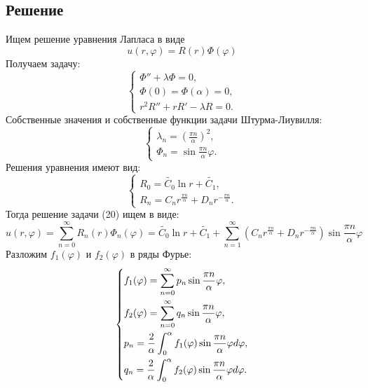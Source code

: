 \documentclass[11pt]{article}
\begin{document}
\subsection{Решение}
\label{sec:orgbcb9ae5}
Ищем решение уравнения Лапласа в виде
\begin{equation*}
u(r, \varphi) = R(r)\Phi(\varphi)
\end{equation*}
Получаем задачу:
\begin{equation*}
\begin{cases}
\Phi'' + \lambda\Phi = 0, \\
\Phi(0) = \Phi(\alpha) = 0, \\
r^2R'' + rR' - \lambda R = 0.
\end{cases}
\end{equation*}
Собственные значения и собственные функции задачи Штурма-Лиувилля:
\begin{equation*}
\begin{cases}
\lambda_n = \left(\frac{\pi n}{\alpha}\right)^2, \\
\Phi_n = \sin\frac{\pi n}{\alpha}\varphi.
\end{cases}
\end{equation*}
Решения уравнения имеют вид:
\begin{equation*}
\begin{cases}
R_0 = \tilde{C_0}\ln r + \tilde{C_1}, \\
R_n = C_nr^{\frac{\pi n}\alpha} + D_nr^{-\frac{\pi n}\alpha}.
\end{cases}
\end{equation*}
Тогда решение задачи (20) ищем в виде:
\begin{equation}
u(r, \varphi) = \sum_{n = 0}^{\infty}R_n(r)\Phi_n(\varphi) = \tilde{C_0}\ln r + \tilde{C_1} +
\sum_{n = 1}^{\infty}(C_nr^{\frac{\pi n}\alpha} + D_nr^{-\frac{\pi n}\alpha})\sin\frac{\pi n}\alpha\varphi
\end{equation}
Разложим $f_1(\varphi)$ и $f_2(\varphi)$ в ряды Фурье:
\begin{equation*}
\begin{dcases}
f_1(\varphi) = \sum_{n = 0}^{\infty}p_n\sin\frac{\pi n}\alpha\varphi, \\
f_2(\varphi) = \sum_{n = 0}^{\infty}q_n\sin\frac{\pi n}\alpha\varphi, \\
p_n = \frac2\alpha\int_0^{\alpha}f_1(\varphi)\sin\frac{\pi n}\alpha\varphi d\varphi, \\
q_n = \frac2\alpha\int_0^{\alpha}f_2(\varphi)\sin\frac{\pi n}\alpha\varphi d\varphi.
\end{dcases}
\end{equation*}
\end{document}
